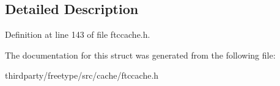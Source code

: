 \subsection{Detailed Description}


Definition at line 143 of file ftccache.\+h.



The documentation for this struct was generated from the following file\+:\begin{DoxyCompactItemize}
\item 
thirdparty/freetype/src/cache/ftccache.\+h\end{DoxyCompactItemize}
